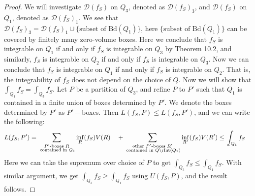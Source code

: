 \documentclass[15pt]{book}
\theoremstyle{break}
\theoremstyle{break}
\def\lowint{\mkern3mu\underline{\vphantom{\intop}\mkern7mu}\mkern-10mu\int}
\newcommand{\D}{\mathcal{D}}
\newcommand{\Bd}{\text{Bd}}
\begin{document}
\begin{proof}
We will investigate $\D(f_S)$ on $Q_3$, denoted as $\D(f_S)_3$, and $\D(f_S)$ on $Q_1$, denoted as $\D(f_S)_1$. We see that $\D(f_S)_3 = \D(f_S)_1 \cup \{ \text{subset of }\Bd(Q_1)\}$, here $\{ \text{subset of }\Bd(Q_1)\}$ can be covered by finitely many zero-volume boxes. Here we conclude that $f_S$ is integrable on $Q_1$ if and only if $f_S$ is integrable on $Q_3$ by Theorem 10.2, and similarly, $f_S$ is integrable on $Q_2$ if and only if $f_S$ is integrable on $Q_3$. Now we can conclude that $f_S$ is integrable on $Q_1$ if and only if $f_S$ is integrable on $Q_2$. That is, the integrability of $f_S$ does not depend on the choice of $Q$. Now we will show that $\int_{Q_1} f_S = \int_{Q_3} f_S$. Let $P $ be a partition of $Q_3$, and refine $P$ to $P'$ such that $Q_1$ is contained in a finite union of boxes determined by $P'$. We denote the boxes determined by $P'$ as $P'-$boxes. Then $L(f_S,P) \leq L(f_S, P')$, and we can write the following:
\begin{align*}
L(f_S, P')&= \sum_{\substack{P' \text{-boxes } R  \\ \text{ contained in } Q_1}} \inf_R (f_S) V(R) \quad + \sum_{\substack{\text{other }P'\text{-boxes } R' \\ \text{ contained in }Q \setminus \text{rInt}(Q_1)}} \inf_{R' }(f_S) V(R') \leq \lowint_{Q_1} f_S
\end{align*}
Here we can take the supremum over choice of $P$ to get $\int_{Q_3} f_S \leq \int_{Q_1} f_S$. With similar argument, we get $\int_{Q_3} f_S \geq \int_{Q_1} f_S$ using $U(f_S,P)$, and the result follows. 
\end{proof}
\newpage
\end{document}
